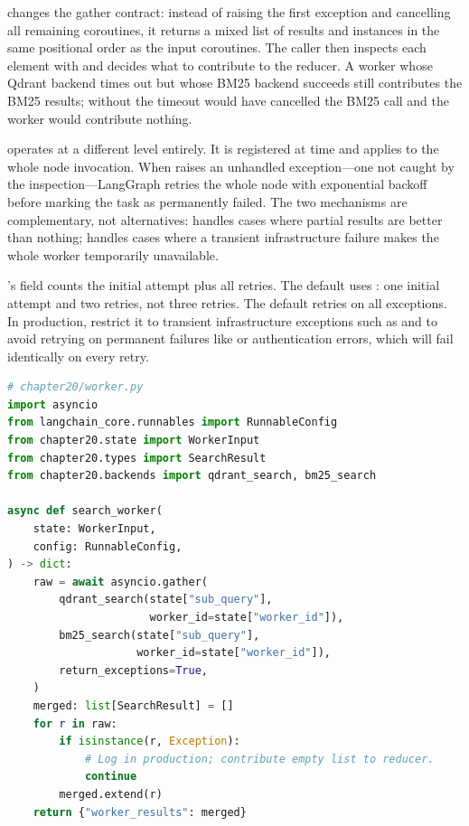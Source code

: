  changes the gather
contract: instead of raising the first exception and cancelling all
remaining coroutines, it returns a mixed list of results and
 instances in the same positional order as the input
coroutines. The caller then inspects each element with
 and decides what to contribute to the
reducer. A worker whose Qdrant backend times out but whose BM25 backend
succeeds still contributes the BM25 results; without
 the timeout would have cancelled the BM25
call and the worker would contribute nothing.

 operates at a different level entirely. It is
registered at  time and applies to the whole node
invocation. When  raises an unhandled exception---one
not caught by the  inspection---LangGraph retries the
whole node with exponential backoff before marking the task as permanently
failed. The two mechanisms are complementary, not alternatives:
 handles cases where partial results are
better than nothing;  handles cases where a transient
infrastructure failure makes the whole worker temporarily unavailable.

\begin{notebox}
's  field counts the initial attempt
plus all retries. The default  uses
: one initial attempt and two retries, not three
retries. The default  retries on all exceptions. In
production, restrict it to transient infrastructure exceptions such as
 and  to avoid
retrying on permanent failures like  or
authentication errors, which will fail identically on every retry.
\end{notebox}

\begin{lstlisting}[language=Python,
  caption={Worker node with two-level error containment},
  label={lst:gather-worker}]
# chapter20/worker.py
import asyncio
from langchain_core.runnables import RunnableConfig
from chapter20.state import WorkerInput
from chapter20.types import SearchResult
from chapter20.backends import qdrant_search, bm25_search

async def search_worker(
    state: WorkerInput,
    config: RunnableConfig,
) -> dict:
    raw = await asyncio.gather(
        qdrant_search(state["sub_query"],
                      worker_id=state["worker_id"]),
        bm25_search(state["sub_query"],
                    worker_id=state["worker_id"]),
        return_exceptions=True,
    )
    merged: list[SearchResult] = []
    for r in raw:
        if isinstance(r, Exception):
            # Log in production; contribute empty list to reducer.
            continue
        merged.extend(r)
    return {"worker_results": merged}
\end{lstlisting}

